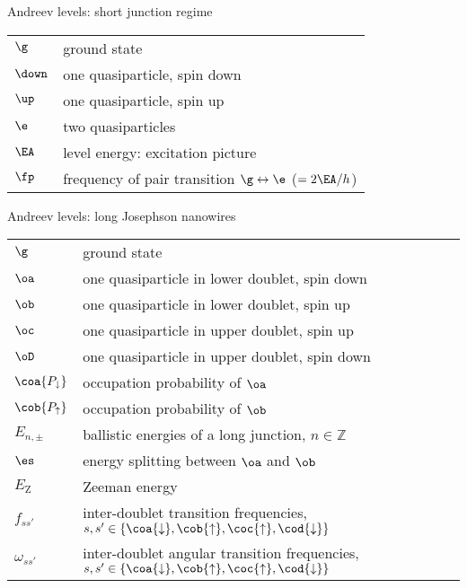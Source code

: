 {\Large\noindent Andreev levels: short junction regime}
\vspace{-.2cm}
\begin{longtable}{ m{5em} m{29em}}
$\g$ & ground state \\
$\down$ & one quasiparticle, spin down \\
$\up$ & one quasiparticle, spin up \\
$\e$ & two quasiparticles \\
$\EA$ & level energy: excitation picture \\
$\fp$ & frequency of pair transition $\g \leftrightarrow \e$ ($= 2 \EA/h$) \\
\end{longtable}
\vspace{.2cm}

{\Large\noindent Andreev levels: long Josephson nanowires}
\vspace{-.2cm}
\begin{longtable}{ m{5em} m{29em}}
$\g$ & ground state \\
$\oa$ &  one quasiparticle in lower doublet, spin down\\
$\ob$ &  one quasiparticle in lower doublet, spin up\\
$\oc$ &  one quasiparticle in upper doublet, spin up\\
$\oD$ &  one quasiparticle in upper doublet, spin down\\
$\coa{P_\downarrow}$ & occupation probability of $\oa$ \\
$\cob{P_\uparrow}$ & occupation probability of $\ob$ \\
$E_{n,\pm}$ & ballistic energies of a long junction, $n \in \mathbb{Z}$ \\
$\es$ & energy splitting between $\oa$ and $\ob$ \\
$E_\mathrm{Z}$ & Zeeman energy\\
$f_{ss'}$ & inter-doublet transition frequencies, $s,s' \in \{ \coa{\downarrow}, \cob{\uparrow}, \coc{\uparrow}, \cod{\downarrow}\}$ \\
$\omega_{ss'}$ & inter-doublet angular transition frequencies, $s,s' \in \{ \coa{\downarrow}, \cob{\uparrow}, \coc{\uparrow}, \cod{\downarrow}\}$ \\
\end{longtable}
\vspace{.2cm}

